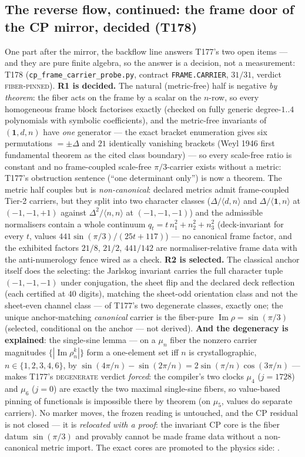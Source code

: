 \documentclass[11pt,a4paper]{article}
\begin{document}
\subsection{The reverse flow, continued: the frame door of the CP mirror, decided (T178)}\label{sec:t178}
One part after the mirror, the backflow line answers T177's two open items ---
and they are pure finite algebra, so the answer is a decision, not a measurement:
T178 (\texttt{cp\_frame\_carrier\_probe.py}, contract \texttt{FRAME.CARRIER},
$31/31$, verdict \textsc{fiber-pinned}). \textbf{R1 is decided.} The natural
(metric-free) half is negative \emph{by theorem}: the fiber acts on the frame by
a scalar on the $n$-row, so every homogeneous frame block factorises exactly
(checked on fully generic degree-$1..4$ polynomials with symbolic coefficients),
and the metric-free invariants of $(\mathbf1,d,n)$ have \emph{one} generator ---
the exact bracket enumeration gives six permutations $=\pm\Delta$ and $21$
identically vanishing brackets (Weyl 1946 first fundamental theorem as the cited
class boundary) --- so every scale-free ratio is constant and no frame-coupled
scale-free $\pi/3$-carrier exists without a metric: T177's obstruction sentence
(``one determinant only'') is now a theorem. The metric half couples but is
\emph{non-canonical}: declared metrics admit frame-coupled Tier-2 carriers, but
they split into two character classes ($\Delta/\langle d,n\rangle$ and
$\Delta/\langle\mathbf1,n\rangle$ at $(-1,-1,+1)$ against
$\Delta^{2}/\langle n,n\rangle$ at $(-1,-1,-1)$) and the admissible normalisers
contain a whole continuum $q_t=t\,n_1^{2}+n_2^{2}+n_3^{2}$ (deck-invariant for
every $t$, values $441\sin(\pi/3)/(25t+117)$) --- no canonical frame factor, and
the exhibited factors $21/8$, $21/2$, $441/142$ are normaliser-relative frame
data with the anti-numerology fence wired as a check. \textbf{R2 is selected.}
The classical anchor itself does the selecting: the Jarlskog invariant carries
the full character tuple $(-1,-1,-1)$ under conjugation, the sheet flip and the
declared deck reflection (each certified at $40$ digits), matching the sheet-odd
orientation class and not the sheet-even channel class --- of T177's two
degenerate classes, exactly one; the unique anchor-matching \emph{canonical}
carrier is the fiber-pure $\operatorname{Im}\rho=\sin(\pi/3)$ (selected,
conditional on the anchor --- not derived). \textbf{And the degeneracy is
explained}: the single-sine lemma --- on a $\mu_n$ fiber the nonzero carrier
magnitudes $\{|\operatorname{Im}\rho_n^{k}|\}$ form a one-element set iff $n$ is
crystallographic, $n\in\{1,2,3,4,6\}$, by
$\sin(4\pi/n)-\sin(2\pi/n)=2\sin(\pi/n)\cos(3\pi/n)$ --- makes T177's
\textsc{degenerate} verdict \emph{forced}: the compiler's two clocks $\mu_4$
($j=1728$) and $\mu_6$ ($j=0$) are exactly the two maximal single-sine fibers,
so value-based pinning of functionals is impossible there by theorem (on
$\mu_5$, values do separate carriers). No marker moves, the frozen reading is
untouched, and the CP residual is not closed --- it is \emph{relocated with a
proof}: the invariant CP core is the fiber datum $\sin(\pi/3)$ and provably
cannot be made frame data without a non-canonical metric import. The exact
cores are promoted to the physics side: .
\end{document}

